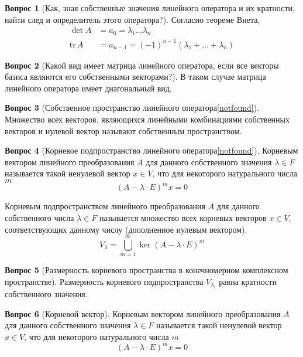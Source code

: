 \documentclass[a4paper,11pt]{article}
\theoremstyle{remark}
\theoremstyle{definition}
\newtheorem{question}{Вопрос}
\begin{document}
\begin{question}[Как, зная собственные значения линейного оператора и их кратности, найти след и определитель этого оператора?]
Согласно теореме Виета, 
\begin{align*}
	\det A &= a_0 = \lambda_1 \dots \lambda_n \\
	\mathrm{tr}\,A &= a_{n-1} = (-1)^{n-1} (\lambda_1 + \dots + \lambda_n)
\end{align*}
\end{question}


\begin{question}[Какой вид имеет матрица линейного оператора, если все векторы базиса являются его собственными векторами?]
В таком случае матрица линейного оператора имеет диагональный вид.
\end{question}


\begin{question}[Собственное пространство линейного оператора\cref{notfound}]
Множество всех векторов, являющихся линейными комбинациями собственных векторов и нулевой вектор называют собственным пространством.
\end{question}


\begin{question}[Корневое подпространство линейного оператора\cref{notfound}]
Корневым вектором линейного преобразования \(A\) для данного собственного значения \(\lambda \in F\) называется такой ненулевой вектор \(x \in V\), что для некоторого натурального числа \(m\)
\begin{equation*}
 	(A - \lambda \cdot E)^mx = 0
\end{equation*} 

Корневым подпространством линейного преобразования \(A\) для данного собственного числа \(\lambda \in F\) называется множество всех корневых векторов \(x \in V\), соответствующих данному числу (дополненное нулевым вектором).
\begin{equation*}
	V_{\lambda} = \bigcup_{m = 1}^{\infty} \ker(A - \lambda \cdot E)^m
\end{equation*}
\end{question}


\begin{question}[Размерность корневого пространства в конечномерном комплексном пространстве]
Размерность корневого подпространства \(V_{\lambda_i}\) равна кратности собственного значения.
\end{question}


\begin{question}[Корневой вектор]
Корневым вектором линейного преобразования \(A\) для данного собственного значения \(\lambda \in F\) называется такой ненулевой вектор \(x \in V\), что для некоторого натурального числа \(m\)
\begin{equation*}
 	(A - \lambda \cdot E)^mx = 0
\end{equation*} 
\end{question}
\end{document}
